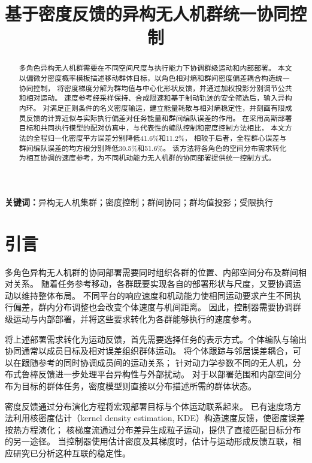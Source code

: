 \documentclass[UTF8,a4paper,11pt,fontset=none]{ctexart}
\title{\bfseries\color{ink}基于密度反馈的异构无人机群统一协同控制}
\author{}\date{}
\begin{document}
\maketitle\vspace{-2em}
\begin{abstract}
多角色异构无人机群需要在不同空间尺度与执行能力下协调群级运动和内部部署。
本文以偏微分密度概率模板描述移动群体目标，以角色相对熵和群间密度偏差耦合构造统一协同控制，
将密度梯度分解为群均值与中心化形状反馈，并通过加权投影分别调节公共和相对运动。
速度参考经采样保持、合成限速和基于制动轨迹的安全筛选后，输入异构内环。
对满足正则条件的名义密度输运，建立能量耗散与相对熵稳定性，并刻画有限成员反馈的计算近似与实际执行偏差对任务能量和群间编队误差的作用。
在采用高斯部署目标和共同执行模型的配对仿真中，与代表性的编队控制和密度控制方法相比，
本文方法的全程归一化密度平方误差分别降低41.6\%和11.2\%，
相较于后者，全程群心误差与群间编队误差的均方根分别降低30.5\%和51.6\%。
该方法将各角色的空间分布需求转化为相互协调的速度参考，为不同机动能力无人机群的协同部署提供统一控制方式。

\end{abstract}
\noindent\textbf{关键词：}异构无人机集群；密度控制；群间协同；群均值投影；受限执行

\section{引言}
多角色异构无人机群的协同部署需要同时组织各群的位置、内部空间分布及群间相对关系。
随着任务参考移动，各群既要实现各自的部署形状与尺度，又要协调运动以维持整体布局。
不同平台的响应速度和机动能力使相同运动要求产生不同执行偏差，群内分布调整也会改变个体速度与机间距离。
因此，控制器需要协调群级运动与内部部署，并将这些要求转化为各群能够执行的速度参考。

将上述部署需求转化为运动反馈，首先需要选择任务的表示方式。个体编队与输出协同通常以成员目标及相对误差组织群体运动。
将个体跟踪与邻居误差耦合，可以在跟随参考的同时协调成员间的运动关系\cite{ren2008}；
针对动力学参数不同的无人机，分布式鲁棒反馈进一步处理平台异构性与外部扰动\cite{imran2024}。
对于以部署范围和内部空间分布为目标的群体任务，密度模型则直接以分布描述所需的群体状态。

密度反馈通过分布演化方程将宏观部署目标与个体运动联系起来。
已有速度场方法利用核密度估计（kernel density estimation, KDE）构造速度反馈，使密度误差按热方程演化\cite{eren2017}；
核梯度流通过分布差异生成粒子运动，提供了直接匹配目标分布的另一途径\cite{arbel2019}。
当控制器使用估计密度及其梯度时，估计与运动形成反馈互联，相应研究已分析这种互联的稳定性\cite{zheng2022feedback}。
\end{document}
